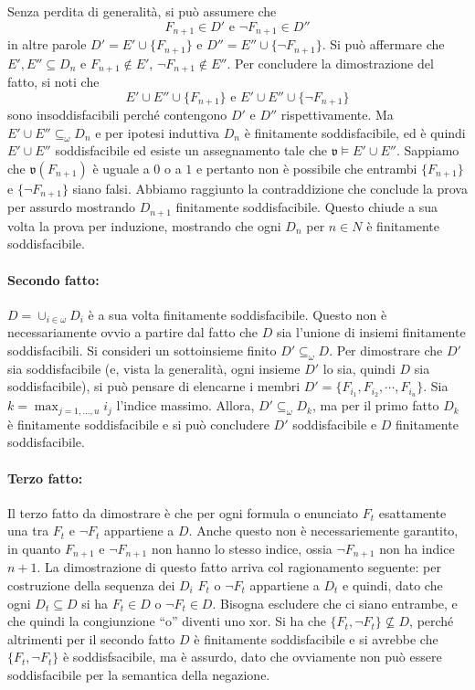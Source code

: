 Senza perdita di generalità, si può assumere che 
$$
F_{n+1} \in D' \text{ e } \neg F_{n+1} \in D''
$$
in altre parole $D' = E' \cup \{F_{n+1}\}$ e $D'' = E'' \cup \{\neg F_{n+1}\}$. 
Si può affermare che $E', E'' \subseteq D_{n}$ e $F_{n+1} \notin E'$, $\neg F_{n+1} \notin E''$.
Per concludere la dimostrazione del 
fatto, si noti che 
$$
E' \cup E'' \cup \{F_{n+1}\} \text{ e } E' \cup E'' \cup \{\neg F_{n+1}\}
$$ 
sono insoddisfacibili perché contengono $D'$ e $D''$ rispettivamente.
Ma $E' \cup E'' \subseteq_{\omega} D_{n}$ e per ipotesi induttiva $D_n$ è 
finitamente soddisfacibile, ed è quindi $E' \cup E''$ soddisfacibile ed esiste 
un assegnamento tale che $\mathfrak{v} \models E' \cup E''$. Sappiamo che 
$\mathfrak{v}(F_{n+1})$ è uguale a $0$ o a $1$ e pertanto non è possibile che entrambi
$\{F_{n+1}\}$ e $\{\neg F_{n+1}\}$ siano falsi. 
Abbiamo raggiunto la contraddizione che conclude la prova per assurdo 
mostrando $D_{n+1}$ finitamente soddisfacibile. Questo chiude a sua volta la 
prova per induzione, mostrando che ogni $D_n$ per $n \in N$ è finitamente 
soddisfacibile. 
 
\paragraph{Secondo fatto:}
$D = \cup_{i \in \omega} D_i$ è a sua volta finitamente 
soddisfacibile. Questo non è necessariamente ovvio a partire dal fatto 
che $D$ sia l'unione di insiemi finitamente soddisfacibili.
Si consideri un sottoinsieme finito $D' \subseteq_{\omega} D$. Per dimostrare 
che $D'$ sia soddisfacibile (e, vista la generalità, ogni insieme $D'$ lo sia, 
quindi $D$ sia soddisfacibile), si può pensare di elencarne 
i membri $D' = \{F_{i_1}, F_{i_2},\cdots,F_{i_u}\}$. Sia $k = \max_{j=1,...,u} i_j$ 
l'indice massimo. Allora, $D' \subseteq_{\omega} D_k$, ma per il primo fatto $D_k$ è
finitamente soddisfacibile e si può concludere $D'$ soddisfacibile
e $D$ finitamente soddisfacibile.

\paragraph{Terzo fatto:}
Il terzo fatto da dimostrare è che per ogni formula o enunciato $F_t$ esattamente 
una tra $F_t$ e $\neg F_t$ appartiene a $D$. Anche questo non è necessariemente 
garantito, in quanto $F_{n+1}$ e $\neg F_{n+1}$ non hanno lo stesso indice, 
ossia $\neg F_{n+1}$ non ha indice ${n+1}$. La dimostrazione di questo fatto 
arriva col  ragionamento seguente: per costruzione della sequenza dei $D_i$ 
$F_t$ o $\neg F_t$ appartiene a $D_t$ e quindi, dato che ogni $D_t \subseteq D$ 
si ha $F_t \in D$ o $\neg F_t \in D$. Bisogna escludere che ci siano entrambe, 
e che quindi la congiunzione ``o'' diventi uno xor. Si ha che $\{F_t, \neg F_t\} \nsubseteq D$, 
perché altrimenti per il secondo fatto $D$ è finitamente soddisfacibile e si avrebbe 
che $\{F_t, \neg F_t\}$ è soddisfsacibile, ma è assurdo, dato che ovviamente 
non può essere soddisfacibile per la semantica della negazione. 

